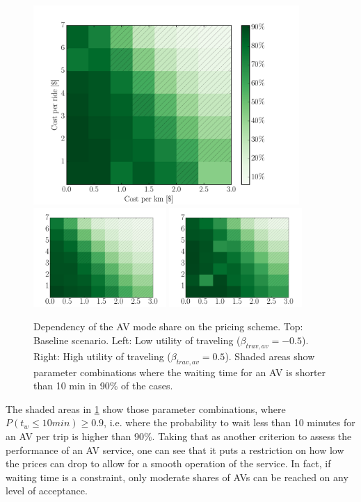 \begin{figure}
    \centering
    \includegraphics[width=0.9\textwidth]{figures/sharegrid.pdf}
    \includegraphics[width=0.45\textwidth]{figures/sharegrid_n05.pdf}
    \includegraphics[width=0.45\textwidth]{figures/sharegrid_p05.pdf}
    \caption{Dependency of the AV mode share on the pricing scheme. Top: Baseline
    scenario. Left: Low utility of traveling ($\beta_{trav,av} = -0.5$). Right: High utility
    of traveling ($\beta_{trav,av} = 0.5$). Shaded areas show parameter combinations
    where the waiting time for an AV is shorter than 10 min in 90\% of the cases.}
    \label{fig:sharegrid}
\end{figure}

The shaded areas in \cref{fig:sharegrid} show those parameter combinations, where
$P(t_w \leq 10min) \geq 0.9$, i.e. where the probability to wait less than 10
minutes for an AV per trip is higher than 90\%. Taking that as another criterion
to assess the performance of an AV service, one can see that it puts a restriction
on how low the prices can drop to allow for a smooth operation of the
service. In fact, if waiting time is a constraint, only moderate shares of AVs
can be reached on any level of acceptance.


